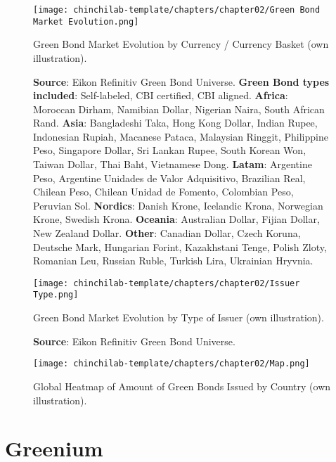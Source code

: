 \begin{center}
\begin{figure}[h!]
    \centering
    \texttt{[image: chinchilab-template/chapters/chapter02/Green Bond Market Evolution.png]}
    \caption{Green Bond Market Evolution by Currency / Currency Basket (own illustration).}
    \caption*{\scriptsize{\textbf{Source}: Eikon Refinitiv Green Bond Universe. \textbf{Green Bond types included}: Self-labeled, CBI certified, CBI aligned. \textbf{Africa}: Moroccan Dirham, Namibian Dollar, Nigerian Naira, South African Rand. \textbf{Asia}: Bangladeshi Taka, Hong Kong Dollar, Indian Rupee, Indonesian Rupiah, Macanese Pataca, Malaysian Ringgit, Philippine Peso, Singapore Dollar, Sri Lankan Rupee, South Korean Won, Taiwan Dollar, Thai Baht, Vietnamese Dong. \textbf{Latam}: Argentine Peso, Argentine Unidades de Valor Adquisitivo, Brazilian Real, Chilean Peso, Chilean Unidad de Fomento, Colombian Peso, Peruvian Sol. \textbf{Nordics}: Danish Krone, Icelandic Krona, Norwegian Krone, Swedish Krona. \textbf{Oceania}: Australian Dollar, Fijian Dollar, New Zealand Dollar. \textbf{Other}: Canadian Dollar, Czech Koruna, Deutsche Mark, Hungarian Forint, Kazakhstani Tenge, Polish Zloty, Romanian Leu, Russian Ruble, Turkish Lira, Ukrainian Hryvnia.}}
    \label{evo1}
\end{figure}

\begin{figure}[h!]
    \centering
    \texttt{[image: chinchilab-template/chapters/chapter02/Issuer Type.png]}
    \caption{Green Bond Market Evolution by Type of Issuer (own illustration).}
    \caption*{\scriptsize{ \textbf{Source}: Eikon Refinitiv Green Bond Universe.}}
    \label{evo2}
\end{figure}
\end{center}


\begin{sidewaysfigure}[htbp!]
    \texttt{[image: chinchilab-template/chapters/chapter02/Map.png]}
    \caption{Global Heatmap of Amount of Green Bonds Issued by Country (own illustration).}
    \label{map}
\end{sidewaysfigure}

 
\section{Greenium}

